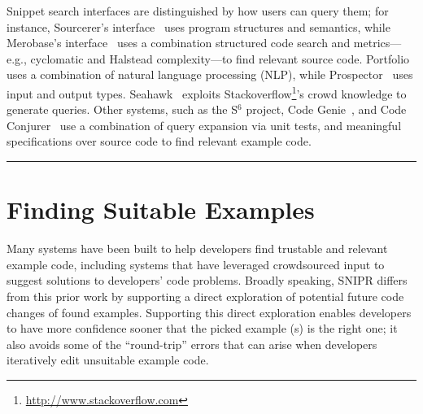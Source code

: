 
Snippet search interfaces are distinguished by how users can query them; for instance, Sourcerer's interface~\cite{Bajracharya:2006vn, Bajracharya:2010um} uses program structures and semantics, while 
Merobase's interface~\cite{Hummel:eq} uses a combination structured code search and metrics---e.g., cyclomatic and Halstead complexity---to find relevant source code. Portfolio\cite{McMillan:2011cm, McMillan:2011wq} uses a combination of natural language processing (NLP), while Prospector~\cite{Mandelin:2005uj} uses input and output types. Seahawk~\cite{Bacchelli:2012dl} exploits Stackoverflow\footnote{\url{http://www.stackoverflow.com}}'s crowd knowledge to generate queries. Other systems, such as the S$^{6}$ project\cite{Reiss:2009fu}, Code Genie~\cite{LazzariniLemos:2007jh}, and Code Conjurer~\cite{Hummel:eq} use a combination of query expansion via unit tests, and meaningful specifications over source code to find relevant example code.
 
\fancybreak{\pfbreakdisplay}

\section{Finding Suitable Examples}
\label{sec:codesearch}

Many systems have been built to help developers find trustable and relevant example code, including systems that have leveraged crowdsourced input to suggest solutions to developers' code problems. Broadly speaking, \uppercase{SnipR} differs from this prior work by supporting a direct exploration of potential future code changes of found examples. Supporting this direct exploration enables developers to have more confidence sooner that the picked example (s) is the right one; it also avoids some of the ``round-trip'' errors that can arise when developers iteratively edit unsuitable example code.

